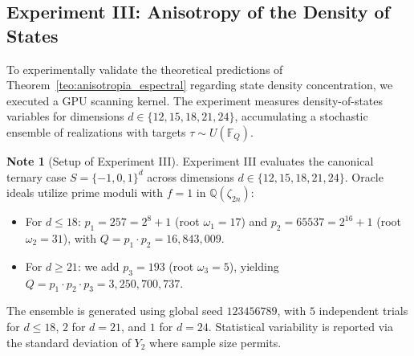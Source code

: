 \documentclass[11pt,a4paper]{article}
\theoremstyle{plain}
\theoremstyle{definition}
\newtheorem{remark}[teorema]{Note}
\numberwithin{equation}{section}
\newcommand{\QQ}{\mathbb{Q}}
\newcommand{\FF}{\mathbb{F}}
\begin{document}
\subsection{Experiment III: Anisotropy of the Density of States}
\label{subsec:exp3_anisotropia}

To experimentally validate the theoretical predictions of Theorem~\ref{teo:anisotropia_espectral} regarding state density concentration, we executed a GPU scanning kernel. The experiment measures density-of-states variables for dimensions $d \in \{12, 15, 18, 21, 24\}$, accumulating a stochastic ensemble of realizations with targets $\tau \sim U(\FF_Q)$.

\begin{remark}[Setup of Experiment III]
\label{rem:config_exp3}
Experiment III evaluates the canonical ternary case $S = \{-1, 0, 1\}^d$ across dimensions $d \in \{12, 15, 18, 21, 24\}$. Oracle ideals utilize prime moduli with $f=1$ in $\QQ(\zeta_{2n})$:
\begin{itemize}
    \item For $d \le 18$: $p_1 = 257 = 2^8+1$ (root $\omega_1 = 17$) and $p_2 = 65537 = 2^{16}+1$ (root $\omega_2 = 31$), with $Q = p_1 \cdot p_2 = 16{,}843{,}009$.
    \item For $d \ge 21$: we add $p_3 = 193$ (root $\omega_3 = 5$), yielding $Q = p_1 \cdot p_2 \cdot p_3 = 3{,}250{,}700{,}737$.
\end{itemize}
The ensemble is generated using global seed $123456789$, with $5$ independent trials for $d \le 18$, $2$ for $d = 21$, and $1$ for $d = 24$. Statistical variability is reported via the standard deviation of $Y_2$ where sample size permits.
\end{remark}
\end{document}
